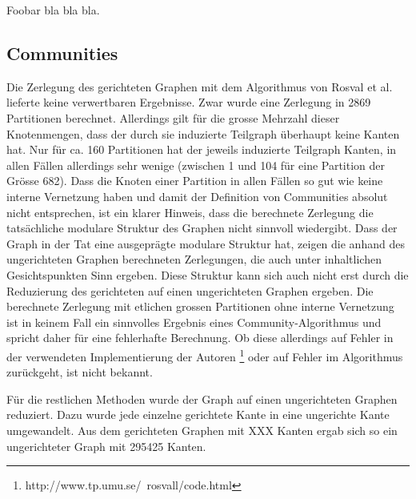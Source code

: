 Foobar bla bla bla.

\subsection{Communities}
\label{sec:result-communities}

Die Zerlegung des gerichteten Graphen mit dem Algorithmus von Rosval
et al. lieferte keine verwertbaren Ergebnisse. Zwar wurde eine
Zerlegung in 2869 Partitionen berechnet. Allerdings gilt f\"ur die
grosse Mehrzahl dieser Knotenmengen, dass der durch sie induzierte
Teilgraph \"uberhaupt keine Kanten hat. Nur f\"ur ca. 160 Partitionen
hat der jeweils induzierte Teilgraph Kanten, in allen F\"allen
allerdings sehr wenige (zwischen 1 und 104 f\"ur eine Partition der
Gr\"osse 682). Dass die Knoten einer Partition in allen F\"allen so
gut wie keine interne Vernetzung haben und damit der Definition von
Communities absolut nicht entsprechen, ist ein klarer Hinweis, dass
die berechnete Zerlegung die tats\"achliche modulare Struktur des
Graphen nicht sinnvoll wiedergibt. Dass der Graph in der Tat eine
ausgepr\"agte modulare Struktur hat, zeigen die anhand des
ungerichteten Graphen berechneten Zerlegungen, die auch unter
inhaltlichen Gesichtspunkten Sinn ergeben. Diese Struktur kann sich
auch nicht erst durch die Reduzierung des gerichteten auf einen
ungerichteten Graphen ergeben. Die berechnete Zerlegung mit etlichen
grossen Partitionen ohne interne Vernetzung ist in keinem Fall ein
sinnvolles Ergebnis eines Community-Algorithmus und spricht daher
f\"ur eine fehlerhafte Berechnung. Ob diese allerdings auf Fehler in
der verwendeten Implementierung der Autoren
\footnote{http://www.tp.umu.se/~rosvall/code.html} oder auf Fehler im
Algorithmus zur\"uckgeht, ist nicht bekannt.

F\"ur die restlichen Methoden wurde der Graph auf einen ungerichteten
Graphen reduziert. Dazu wurde jede einzelne gerichtete Kante in eine
ungerichte Kante umgewandelt. Aus dem gerichteten Graphen mit XXX
Kanten ergab sich so ein ungerichteter Graph mit 295425 Kanten.

